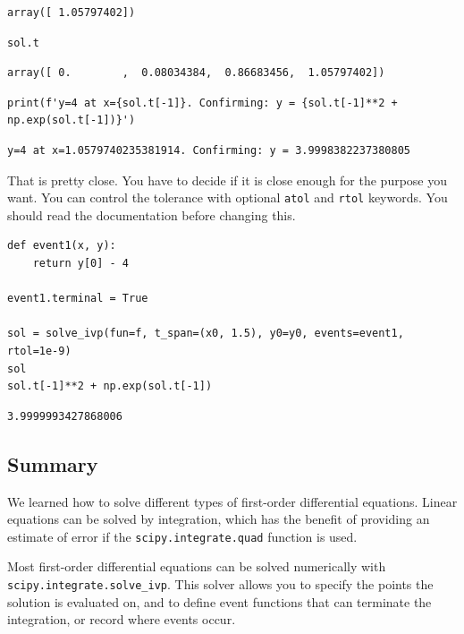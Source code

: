 \documentclass[11pt]{article}
\begin{document}
\begin{verbatim}
array([ 1.05797402])
\end{verbatim}

\begin{verbatim}
sol.t
\end{verbatim}

\begin{verbatim}
array([ 0.        ,  0.08034384,  0.86683456,  1.05797402])
\end{verbatim}

\begin{verbatim}
print(f'y=4 at x={sol.t[-1]}. Confirming: y = {sol.t[-1]**2 + np.exp(sol.t[-1])}')
\end{verbatim}

\begin{verbatim}
y=4 at x=1.0579740235381914. Confirming: y = 3.9998382237380805

\end{verbatim}


That is pretty close. You have to decide if it is close enough for the purpose you want. You can control the tolerance with optional \texttt{atol} and \texttt{rtol} keywords. You should read the documentation before changing this.

\begin{verbatim}
def event1(x, y):
    return y[0] - 4

event1.terminal = True

sol = solve_ivp(fun=f, t_span=(x0, 1.5), y0=y0, events=event1, rtol=1e-9)
sol
sol.t[-1]**2 + np.exp(sol.t[-1])
\end{verbatim}

\begin{verbatim}
3.9999993427868006
\end{verbatim}

\subsection{Summary}
\label{sec:org960b50a}

We learned how to solve different types of first-order differential equations. Linear equations can be solved by integration, which has the benefit of providing an estimate of error if the \texttt{scipy.integrate.quad} function is used.

Most first-order differential equations can be solved numerically with \texttt{scipy.integrate.solve\_ivp}. This solver allows you to specify the points the solution is evaluated on, and to define event functions that can terminate the integration, or record where events occur.
\end{document}
